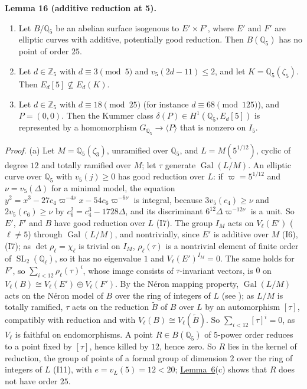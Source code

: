 \documentclass[11pt]{article}
\newenvironment{statement}[1]{\par\medskip\noindent\phantomsection\textbf{#1}\ }{\par\medskip}
\newcommand{\Q}{\mathbb Q}
\newcommand{\Z}{\mathbb Z}
\DeclareMathOperator{\Gal}{Gal}
\DeclareMathOperator{\SL}{SL}
\begin{document}
\begin{statement}{Lemma 16 (additive reduction at 5).}\label{lemma-additive}
\begin{enumerate}
\item[(a)] Let \(B/\Q_5\) be an abelian surface isogenous to \(E'\times F'\), where \(E'\) and \(F'\) are elliptic
curves with additive, potentially good reduction. Then \(B(\Q_5)\) has no point of order \(25\).
\item[(b)] Let \(d\in\Z_5\) with \(d\equiv3\pmod5\) and \(v_5(2d-11)\le2\), and let \(K=\Q_5(\zeta_5)\). Then
\(E_d[5]\not\subseteq E_d(K)\).
\item[(c)] Let \(d\in\Z_5\) with \(d\equiv18\pmod{25}\) (for instance \(d\equiv68\pmod{125}\)), and \(P=(0,0)\). Then
the Kummer class \(\delta(P)\in H^1(\Q_5,E_d[5])\) is represented by a homomorphism \(G_{\Q_5}\to\langle P\rangle\)
that is nonzero on \(I_5\).
\end{enumerate}
\end{statement}

\emph{Proof.} (a) Let \(M=\Q_5(\zeta_3)\), unramified over \(\Q_5\), and \(L=M(5^{1/12})\), cyclic of degree \(12\)
and totally ramified over \(M\); let \(\tau\) generate \(\Gal(L/M)\). An elliptic curve over \(\Q_5\) with
\(v_5(j)\ge0\) has good reduction over \(L\): if \(\varpi=5^{1/12}\) and \(\nu=v_5(\Delta)\) for a minimal model, the
equation \(y^2=x^3-27c_4\varpi^{-4\nu}x-54c_6\varpi^{-6\nu}\) is integral, because \(3v_5(c_4)\ge\nu\) and
\(2v_5(c_6)\ge\nu\) by \(c_6^2=c_4^3-1728\Delta\), and its discriminant \(6^{12}\Delta\varpi^{-12\nu}\) is a unit. So
\(E'\), \(F'\) and \(B\) have good reduction over \(L\) (I7). The group \(I_M\) acts on \(V_\ell(E')\)
(\(\ell\neq5\)) through \(\Gal(L/M)\), and nontrivially, since \(E'\) is additive over \(M\) (I6), (I7); as
\(\det\rho_\ell=\chi_\ell\) is trivial on \(I_M\), \(\rho_\ell(\tau)\) is a nontrivial element of finite order of
\(\SL_2(\Q_\ell)\), so it has no eigenvalue \(1\) and \(V_\ell(E')^{I_M}=0\). The same holds for \(F'\), so
\(\sum_{i<12}\rho_\ell(\tau)^i\), whose image consists of \(\tau\)-invariant vectors, is \(0\) on \(V_\ell(B)\cong
V_\ell(E')\oplus V_\ell(F')\). By the N\'eron mapping property, \(\Gal(L/M)\) acts on the N\'eron model of \(B\)
over the ring of integers of \(L\) (see \cite[\S2]{ST}); as \(L/M\) is totally ramified, \(\tau\) acts on the
reduction \(\widetilde B\) of \(B\) over \(L\) by an automorphism \([\tau]\), compatibly with reduction and with
\(V_\ell(B)\cong V_\ell(\widetilde B)\). So \(\sum_{i<12}[\tau]^i=0\), as \(V_\ell\) is faithful on endomorphisms. A point \(R\in B(\Q_5)\) of \(5\)-power order reduces to a point fixed by
\([\tau]\), hence killed by \(12\), hence zero. So \(R\) lies in the kernel of reduction, the group of points of a
formal group of dimension \(2\) over the ring of integers of \(L\) (I11), with \(e=v_L(5)=12<20\);
\hyperref[lemma-formal]{Lemma~6}(c) shows that \(R\) does not have order \(25\).
\end{document}
